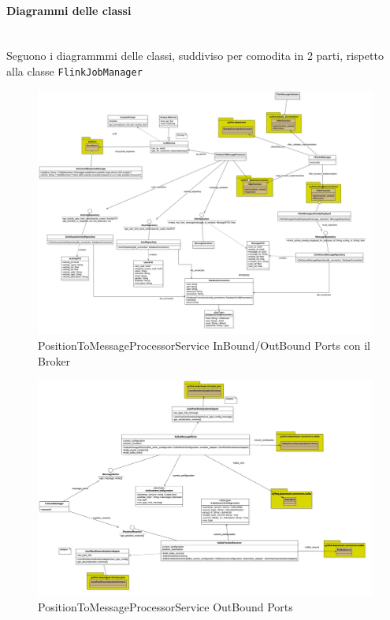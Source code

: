 \documentclass[10pt]{article}
\newcommand{\myparagraph}[1]{\paragraph{#1}\mbox{}\\}
\begin{document}
        \myparagraph{Diagrammi delle classi}
        Seguono i diagrammmi delle classi, suddiviso per comodita in 2 parti, rispetto alla classe \texttt{FlinkJobManager}
        \begin{figure}[H]
        \hspace{-1.5cm} %
        \includegraphics[width=1.24\textwidth]{flink2.jpg}
        \caption{PositionToMessageProcessorService InBound/OutBound Ports con il Broker}
        \end{figure}

        \begin{figure}[H]
        \hspace{-1.5cm}
        \includegraphics[width=1.25\textwidth]{flink1.jpg}
        \caption{PositionToMessageProcessorService OutBound Ports}
        \end{figure}
\end{document}

